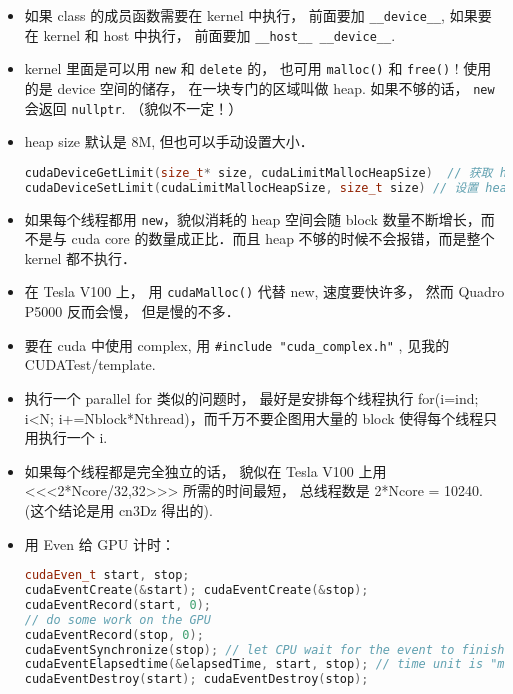 \begin{itemize}
\item 如果 class 的成员函数需要在 kernel 中执行， 前面要加 \verb`__device__`, 如果要在 kernel 和 host 中执行， 前面要加 \verb`__host__ __device__`.
\item kernel 里面是可以用 \verb`new` 和 \verb`delete` 的， 也可用 \verb`malloc()` 和 \verb`free()` ! 使用的是 device 空间的储存， 在一块专门的区域叫做 heap. 如果不够的话， \verb`new` 会返回 \verb`nullptr`. （貌似不一定！）
\item heap size 默认是 8M, 但也可以手动设置大小．
\begin{lstlisting}[language=cpp]
cudaDeviceGetLimit(size_t* size, cudaLimitMallocHeapSize)  // 获取 heap size
cudaDeviceSetLimit(cudaLimitMallocHeapSize, size_t size) // 设置 heap size
\end{lstlisting}
\item 如果每个线程都用 \verb`new`，貌似消耗的 heap 空间会随 block 数量不断增长，而不是与 cuda core 的数量成正比．而且 heap 不够的时候不会报错，而是整个 kernel 都不执行．
\item 在 Tesla V100 上， 用 \verb`cudaMalloc()` 代替 new, 速度要快许多，  然而 Quadro P5000 反而会慢， 但是慢的不多．
\item 要在 cuda 中使用 complex, 用 \verb`#include "cuda_complex.h"` , 见我的 CUDATest/template.
\item 执行一个 parallel for 类似的问题时， 最好是安排每个线程执行 for(i=ind; i<N; i+=Nblock*Nthread)，而千万不要企图用大量的 block 使得每个线程只用执行一个 i.
\item 如果每个线程都是完全独立的话， 貌似在 Tesla V100 上用 <<<2*Ncore/32,32>>> 所需的时间最短， 总线程数是 2*Ncore = 10240. (这个结论是用 cn3Dz 得出的).
\item 用 Even 给 GPU 计时：
\begin{lstlisting}[language=cpp]
cudaEven_t start, stop;
cudaEventCreate(&start); cudaEventCreate(&stop);
cudaEventRecord(start, 0);
// do some work on the GPU
cudaEventRecord(stop, 0);
cudaEventSynchronize(stop); // let CPU wait for the event to finish
cudaEventElapsedtime(&elapsedTime, start, stop); // time unit is "ms"
cudaEventDestroy(start); cudaEventDestroy(stop);
\end{lstlisting}


\end{itemize}
